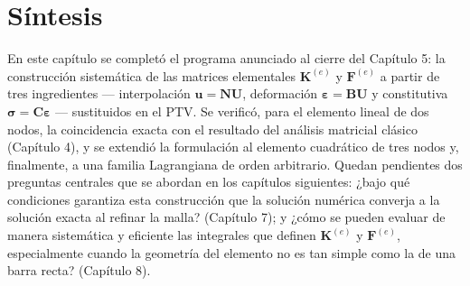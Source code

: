 \section{Síntesis}

En este capítulo se completó el programa anunciado al cierre del Capítulo 5: la construcción sistemática de las matrices elementales $\bm K^{(e)}$ y $\bm F^{(e)}$ a partir de tres ingredientes --- interpolación $\bm u=\bm N\bm U$, deformación $\bm\varepsilon=\bm B\bm U$ y constitutiva $\bm\sigma=\bm C\bm\varepsilon$ --- sustituidos en el PTV. Se verificó, para el elemento lineal de dos nodos, la coincidencia exacta con el resultado del análisis matricial clásico (Capítulo 4), y se extendió la formulación al elemento cuadrático de tres nodos y, finalmente, a una familia Lagrangiana de orden arbitrario. Quedan pendientes dos preguntas centrales que se abordan en los capítulos siguientes: ¿bajo qué condiciones garantiza esta construcción que la solución numérica converja a la solución exacta al refinar la malla? (Capítulo 7); y ¿cómo se pueden evaluar de manera sistemática y eficiente las integrales que definen $\bm K^{(e)}$ y $\bm F^{(e)}$, especialmente cuando la geometría del elemento no es tan simple como la de una barra recta? (Capítulo 8).
